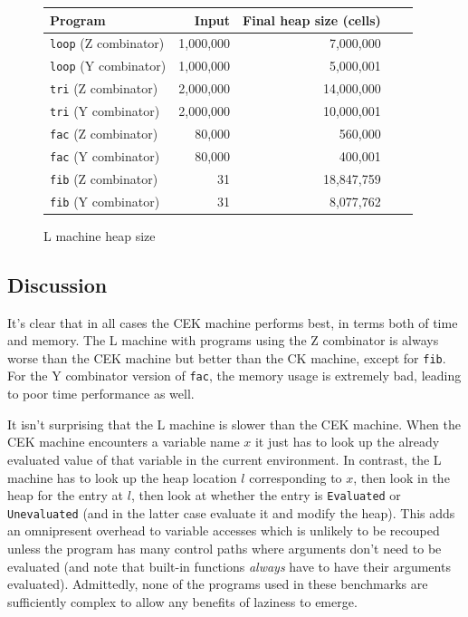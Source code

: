 \documentclass[a4paper]{article}
\begin{document}
\begin{figure}
\centering
\begin{tabular}{|l|r|r|r|r|} 
\hline
Program   &  Input &  Final heap size (cells) \\
\hline
\hline
\texttt{loop} (Z combinator) & 1,000,000 & 7,000,000\\
\texttt{loop} (Y combinator) & 1,000,000 & 5,000,001\\
\hline
\hline
\texttt{tri} (Z combinator)& 2,000,000 & 14,000,000\\
\texttt{tri} (Y combinator)& 2,000,000 & 10,000,001\\
\hline
\hline
\texttt{fac} (Z combinator)& 80,000 & 560,000 \\
\texttt{fac} (Y combinator)& 80,000 & 400,001\\
\hline
\hline
\texttt{fib} (Z combinator)& 31 & 18,847,759\\
\texttt{fib} (Y combinator)& 31 & 8,077,762\\
\hline
\end{tabular}
\caption{L machine heap size}\label{fig:maxheap}
\end{figure}


\subsection*{Discussion} It's clear that in all cases the CEK machine performs best, 
in terms both of time and memory.  The L machine with programs using
the Z combinator is always worse than the CEK machine but better than
the CK machine, except for \texttt{fib}.  For the Y combinator version
of \texttt{fac}, the memory usage is extremely bad, leading to
poor time performance as well.

It isn't surprising that the L machine is slower than the CEK machine.
When the CEK machine encounters a variable name $x$ it just has to
look up the already evaluated value of that variable in the current
environment.  In contrast, the L machine has to look up the heap
location $l$ corresponding to $x$, then look in the heap for the entry at $l$,
then look at whether the entry is \texttt{Evaluated} or
\texttt{Unevaluated} (and in the latter case evaluate it and modify the heap).
This adds an omnipresent overhead to variable accesses which is
unlikely to be recouped unless the program has many control paths
where arguments don't need to be evaluated (and note that built-in
functions \textit{always} have to have their arguments evaluated).
Admittedly, none of the programs used in these benchmarks
are sufficiently complex to allow any benefits of laziness to 
emerge.
\end{document}
